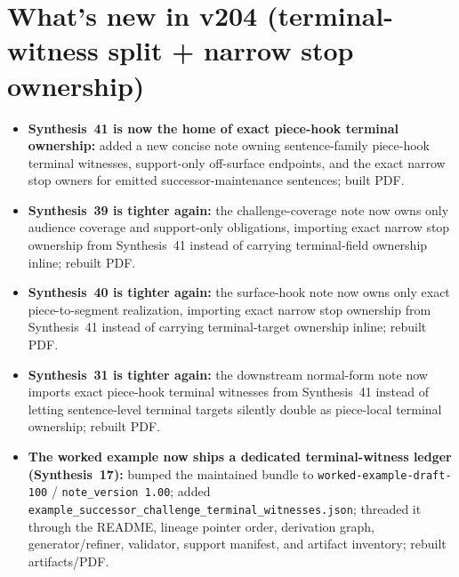 \documentclass[11pt]{article}
\begin{document}
\section{What's new in v204 (terminal-witness split + narrow stop ownership)}
\begin{itemize}[leftmargin=*]
\item \textbf{Synthesis~41 is now the home of exact piece-hook terminal ownership:} added a new concise note owning sentence-family piece-hook terminal witnesses, support-only off-surface endpoints, and the exact narrow stop owners for emitted successor-maintenance sentences; built PDF.
\item \textbf{Synthesis~39 is tighter again:} the challenge-coverage note now owns only audience coverage and support-only obligations, importing exact narrow stop ownership from Synthesis~41 instead of carrying terminal-field ownership inline; rebuilt PDF.
\item \textbf{Synthesis~40 is tighter again:} the surface-hook note now owns only exact piece-to-segment realization, importing exact narrow stop ownership from Synthesis~41 instead of carrying terminal-target ownership inline; rebuilt PDF.
\item \textbf{Synthesis~31 is tighter again:} the downstream normal-form note now imports exact piece-hook terminal witnesses from Synthesis~41 instead of letting sentence-level terminal targets silently double as piece-local terminal ownership; rebuilt PDF.
\item \textbf{The worked example now ships a dedicated terminal-witness ledger (Synthesis~17):} bumped the maintained bundle to \texttt{worked-example-draft-100} / \texttt{note\_version 1.00}; added \texttt{example\_successor\_challenge\_terminal\_witnesses.json}; threaded it through the README, lineage pointer order, derivation graph, generator/refiner, validator, support manifest, and artifact inventory; rebuilt artifacts/PDF.
\end{itemize}
\end{document}
